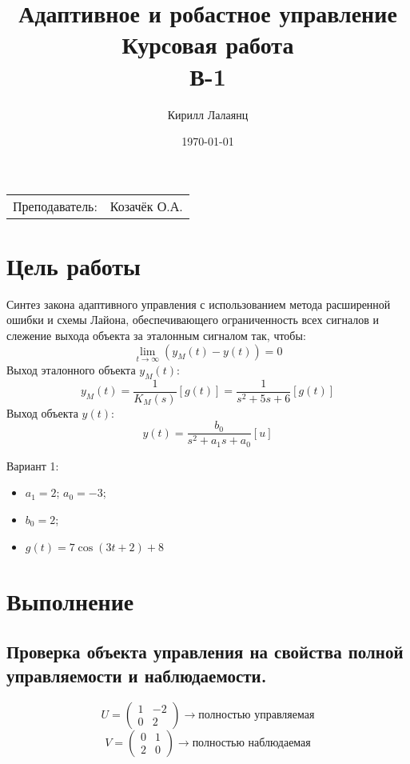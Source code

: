 \documentclass{article}
\title{Адаптивное и робастное управление \\ Курсовая работа\\ В-1} %
\author{Кирилл Лалаянц} %
\date{\today} %
\begin{document}
\maketitle %

\begin{center}
\begin{tabular}{l r}
Преподаватель: & Козачёк О.А. %
\end{tabular}
\end{center}
\newpage

\section{Цель работы}

Синтез закона адаптивного управления с использованием метода расширенной ошибки и схемы Лайона, обеспечивающего
ограниченность всех сигналов и слежение выхода объекта за эталонным
сигналом так, чтобы:
\[\lim_{t \rightarrow \infty}(y_M(t) - y(t)) = 0\]
Выход эталонного объекта \(y_M(t)\):
\[y_M(t) = \frac{1}{K_M(s)}[g(t)]=  \frac{1}{s^2 + 5s + 6}[g(t)]\]
Выход объекта \(y(t)\):
\[y(t) = \frac{b_0}{s^2 + a_1 s + a_0}[u]\]

Вариант 1: 
\begin{itemize}
  \item \(a_1 = 2\); \(a_0 = -3\);
  \item \(b_0 = 2\);
  \item \(g(t) = 7 \cos(3t + 2) + 8\)
\end{itemize}


\section{Выполнение}
\subsection{Проверка объекта управления на свойства полной управляемости и наблюдаемости.}
\[U = \begin{pmatrix}
  1 & -2 \\
  0 & 2
\end{pmatrix} \rightarrow \text{полностью управляемая}\]
\[V = \begin{pmatrix}
  0 & 1 \\
  2 & 0
\end{pmatrix} \rightarrow \text{полностью наблюдаемая}\]
\end{document}
